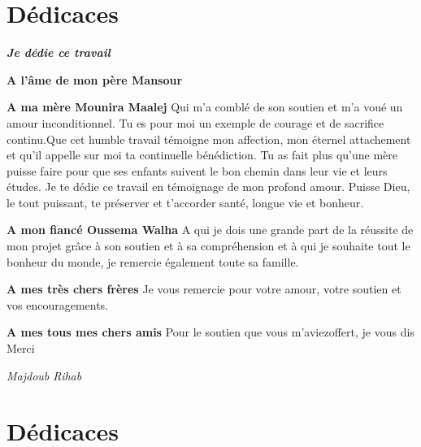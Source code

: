 \section*{Dédicaces}
\vspace{1.0in}

\begin{center}
    \slshape

    \textit{\bfseries Je dédie ce travail}

    \textbf{A l'âme de mon père Mansour}

    \vspace{0.2in}
    \textbf{A ma mère Mounira Maalej}
    Qui m'a comblé de son soutien et m'a voué un amour inconditionnel. Tu
    es pour moi un exemple de courage et de sacrifice continu.Que cet
    humble travail témoigne mon affection, mon éternel attachement et qu'il
    appelle sur moi ta continuelle bénédiction. Tu as fait plus qu’une mère
    puisse faire pour que ses enfants suivent le bon chemin dans leur vie
    et leurs études.  Je te dédie ce travail en témoignage de mon profond
    amour. Puisse Dieu, le tout puissant, te préserver et t’accorder santé,
    longue vie et bonheur.

    \vspace{0.2in}
    \textbf{A mon fiancé Oussema Walha}
    A qui je dois une grande part de la réussite de mon projet grâce à son
    soutien et à sa compréhension et à qui je souhaite tout le bonheur du
    monde, je remercie également toute sa famille.

    \vspace{0.2in}
    \textbf{A mes très chers frères}
    Je vous remercie pour votre amour, votre soutien et vos encouragements.

    \vspace{0.2in}
    \textbf{A mes tous mes chers amis}
    Pour le soutien que vous m'aviezoffert, je vous dis Merci

    \begin{flushright}
        \textit{\emph{Majdoub Rihab}}
    \end{flushright}
\end{center}

\clearpage

\section*{Dédicaces}
\vspace{1.0in}


